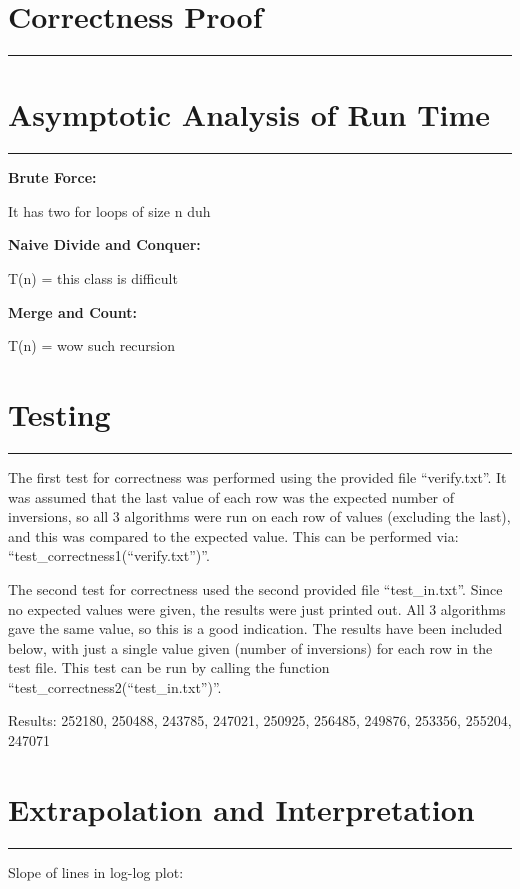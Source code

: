 \documentclass[letterpaper,10pt,titlepage,fleqn]{article}
\begin{document}
\section*{Correctness Proof}
\hrule

\section*{Asymptotic Analysis of Run Time}
\hrule
\begin{centering}
\textbf{Brute Force:}
\end{centering}
It has two for loops of size n duh

\begin{centering}
\textbf{Naive Divide and Conquer:}
\end{centering}
T(n) = this class is difficult

\begin{centering}
\textbf{Merge and Count:}
\end{centering}
T(n) = wow such recursion


\section*{Testing}
\hrule
The first test for correctness was performed using the provided file ``verify.txt''. It was assumed that the last value of each row was the expected number of inversions, so all 3 algorithms were run on each row of values (excluding the last), and this was compared to the expected value. This can be performed via: ``test\_correctness1(``verify.txt'')''.

The second test for correctness used the second provided file ``test\_in.txt''. Since no expected values were given, the results were just printed out. All 3 algorithms gave the same value, so this is a good indication. The results have been included below, with just a single value given (number of inversions) for each row in the test file. This test can be run by calling the function ``test\_correctness2(``test\_in.txt'')''.

Results:
252180, 250488, 243785, 247021, 250925, 256485, 249876, 253356, 255204, 247071

\section*{Extrapolation and Interpretation}
\hrule

Slope of lines in log-log plot:
\end{document}
